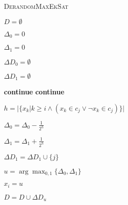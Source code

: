 \begin{algorithm}[h]
	\caption{\textsc{DerandomMaxEkSat}}
	\label{algo:DerandomMaxEkSat}

	$D = \emptyset$ 

	{
		$\Delta_0 = 0$

		$\Delta_1 = 0$

		$\Delta D_0 = \emptyset$

		$\Delta D_1 = \emptyset$

		{
			{
				\textbf{continue}
			}
			{
				\textbf{continue}
			}

			$h = |\{x_k | k \geq i \land (x_k \in c_j \lor \neg x_k \in c_j)\}|$ 

			{

				$\Delta_0 = \Delta_0 - \frac{1}{2^h}$

				$\Delta_1 = \Delta_1 + \frac{1}{2^h}$

				$\Delta D_1 = \Delta D_1 \cup \{j\}$

			} 

		}

		$ u = \arg \max_{0,1} \{\Delta_0, \Delta_1\}$

		$x_i = u$

		$D = D \cup \Delta D_u$
	}
\end{algorithm}

